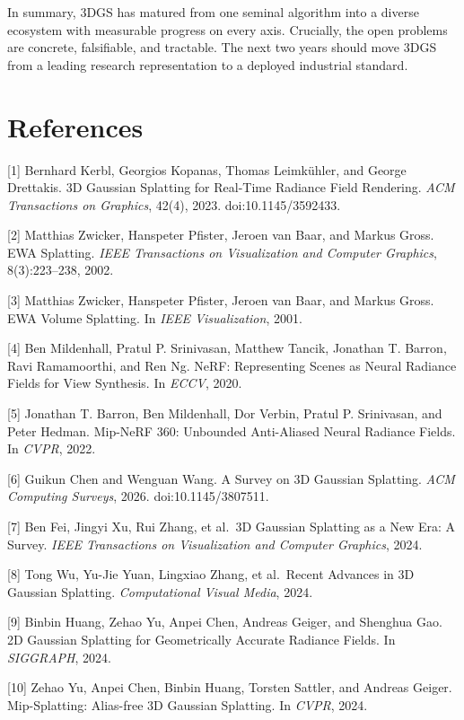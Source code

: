 In summary, 3DGS has matured from one seminal algorithm into a diverse ecosystem with measurable progress on every axis. Crucially, the open problems are concrete, falsifiable, and tractable. The next two years should move 3DGS from a leading research representation to a deployed industrial standard.

\section{References}\label{references}

{[}1{]} Bernhard Kerbl, Georgios Kopanas, Thomas Leimkühler, and George Drettakis. 3D Gaussian Splatting for Real-Time Radiance Field Rendering. \emph{ACM Transactions on Graphics}, 42(4), 2023. doi:10.1145/3592433.

{[}2{]} Matthias Zwicker, Hanspeter Pfister, Jeroen van Baar, and Markus Gross. EWA Splatting. \emph{IEEE Transactions on Visualization and Computer Graphics}, 8(3):223--238, 2002.

{[}3{]} Matthias Zwicker, Hanspeter Pfister, Jeroen van Baar, and Markus Gross. EWA Volume Splatting. In \emph{IEEE Visualization}, 2001.

{[}4{]} Ben Mildenhall, Pratul P. Srinivasan, Matthew Tancik, Jonathan T. Barron, Ravi Ramamoorthi, and Ren Ng. NeRF: Representing Scenes as Neural Radiance Fields for View Synthesis. In \emph{ECCV}, 2020.

{[}5{]} Jonathan T. Barron, Ben Mildenhall, Dor Verbin, Pratul P. Srinivasan, and Peter Hedman. Mip-NeRF 360: Unbounded Anti-Aliased Neural Radiance Fields. In \emph{CVPR}, 2022.

{[}6{]} Guikun Chen and Wenguan Wang. A Survey on 3D Gaussian Splatting. \emph{ACM Computing Surveys}, 2026. doi:10.1145/3807511.

{[}7{]} Ben Fei, Jingyi Xu, Rui Zhang, et al.~3D Gaussian Splatting as a New Era: A Survey. \emph{IEEE Transactions on Visualization and Computer Graphics}, 2024.

{[}8{]} Tong Wu, Yu-Jie Yuan, Lingxiao Zhang, et al.~Recent Advances in 3D Gaussian Splatting. \emph{Computational Visual Media}, 2024.

{[}9{]} Binbin Huang, Zehao Yu, Anpei Chen, Andreas Geiger, and Shenghua Gao. 2D Gaussian Splatting for Geometrically Accurate Radiance Fields. In \emph{SIGGRAPH}, 2024.

{[}10{]} Zehao Yu, Anpei Chen, Binbin Huang, Torsten Sattler, and Andreas Geiger. Mip-Splatting: Alias-free 3D Gaussian Splatting. In \emph{CVPR}, 2024.

